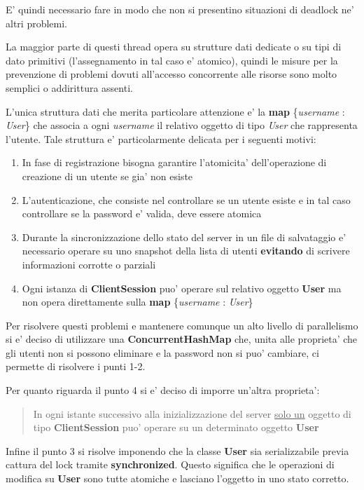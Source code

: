 E' quindi necessario fare in modo che non si presentino situazioni di deadlock ne' altri problemi.

La maggior parte di questi thread opera su strutture dati dedicate o su tipi di dato primitivi (l'assegnamento in tal caso e' atomico), quindi le misure per la prevenzione di problemi dovuti all'accesso concorrente alle risorse sono molto semplici o addirittura assenti.

L'unica struttura dati che merita particolare attenzione e' la \textbf{map} \{\emph{username} : \emph{User}\} che associa a ogni \emph{username} il relativo oggetto di tipo \emph{User} che rappresenta l'utente. Tale struttura e' particolarmente delicata per i seguenti motivi:
\begin{enumerate}
	\item In fase di registrazione bisogna garantire l'atomicita' dell'operazione di creazione di un utente se gia' non esiste
	\item L'autenticazione, che consiste nel controllare se un utente esiste e in tal caso controllare se la password e' valida, deve essere atomica
	\item Durante la sincronizzazione dello stato del server in un file di salvataggio e' necessario operare su uno snapshot della lista di utenti \textbf{evitando} di scrivere informazioni corrotte o parziali
	\item Ogni istanza di \textbf{ClientSession} puo' operare sul relativo oggetto \textbf{User} ma non opera direttamente sulla \textbf{map} \{\emph{username} : \emph{User}\}
\end{enumerate}

Per risolvere questi problemi e mantenere comunque un alto livello di parallelismo si e' deciso di utilizzare una \textbf{ConcurrentHashMap} che, unita alle proprieta' che gli utenti non si possono eliminare e la password non si puo' cambiare, ci permette di risolvere i punti 1-2.

Per quanto riguarda il punto 4 si e' deciso di imporre un'altra proprieta':
\begin{quote}
	 In ogni istante successivo alla inizializzazione del server \underline{solo un} oggetto di tipo \textbf{ClientSession} puo' operare su un determinato oggetto \textbf{User}
\end{quote}

Infine il punto 3 si risolve imponendo che la classe \textbf{User} sia serializzabile previa cattura del lock tramite \textbf{synchronized}. Questo significa che le operazioni di modifica su \textbf{User} sono tutte atomiche e lasciano l'oggetto in uno stato corretto.

